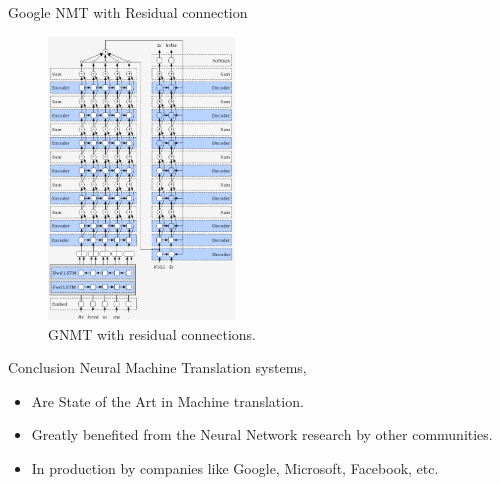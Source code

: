 ﻿\documentclass[aspectratio=43,mathserif,xcolor={usenames,dvipsnames,svgnames,table},10pt]{beamer}
\begin{document}
\begin{frame}{Google NMT with Residual connection}
 \begin{figure}[h]
    \includegraphics[height=7.5cm]{images/residual_gnmt.png}  
    \caption{ GNMT with residual connections.}
  \end{figure}
\end{frame}

\begin{frame}{Conclusion}
Neural Machine Translation systems,
\begin{itemize} 
 \item Are State of the Art in Machine translation.
 \item Greatly benefited from the Neural Network research by other communities.
 \item In production by companies like Google, Microsoft, Facebook, etc.
\end{itemize}

\end{frame}
\end{document}
